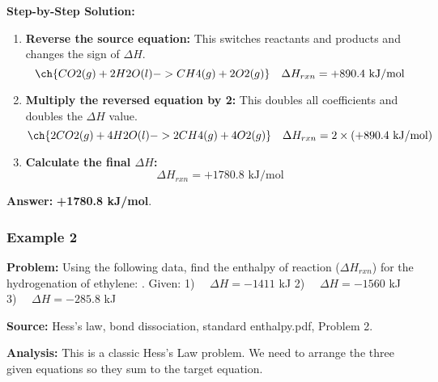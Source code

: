 \documentclass{article}
\begin{document}
\textbf{Step-by-Step Solution:}
\begin{enumerate}
    \item \textbf{Reverse the source equation:} This switches reactants and products and changes the sign of $\Delta H$.
    \[ \ch{CO2(g) + 2H2O(l) -> CH4(g) + 2O2(g)} \quad \Delta H_{rxn} = +890.4 \text{ kJ/mol} \]
    \item \textbf{Multiply the reversed equation by 2:} This doubles all coefficients and doubles the $\Delta H$ value.
    \[ \ch{2CO2(g) + 4H2O(l) -> 2CH4(g) + 4O2(g)} \quad \Delta H_{rxn} = 2 \times (+890.4 \text{ kJ/mol}) \]
    \item \textbf{Calculate the final $\Delta H$:}
    \[ \Delta H_{rxn} = +1780.8 \text{ kJ/mol} \]
\end{enumerate}

\textbf{Answer:} \textbf{+1780.8 kJ/mol}.

\subsubsection{Example 2}
\textbf{Problem:} Using the following data, find the enthalpy of reaction ($\Delta H_{rxn}$) for the hydrogenation of ethylene: .
Given:
1)  $\quad \Delta H = -1411$ kJ
2)  $\quad \Delta H = -1560$ kJ
3)  $\quad \Delta H = -285.8$ kJ

\textbf{Source:} Hess's law, bond dissociation, standard enthalpy.pdf, Problem 2.

\textbf{Analysis:} This is a classic Hess's Law problem. We need to arrange the three given equations so they sum to the target equation.
\end{document}
